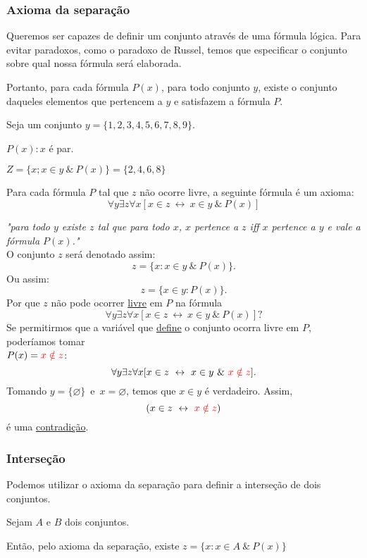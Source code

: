 \subsubsection{Axioma da separação}
Queremos ser capazes de definir um conjunto através de uma fórmula lógica. Para evitar paradoxos, como o paradoxo de Russel, temos que especificar o conjunto sobre qual nossa fórmula será elaborada.
\begin{stat}
    Portanto, para cada fórmula $P(x)$, para todo conjunto $y$, existe o conjunto daqueles elementos que pertencem a $y$ e satisfazem a fórmula $P$.
\end{stat}
\begin{exmp}
    Seja um conjunto $y = \{1,2,3,4,5,6,7,8,9\}$.

    $P(x): x$ é par.

    $Z = \{x; x \in y\ \&\ P(x)\} = \{2,4,6,8\}$
\end{exmp}
\begin{definition}
    Para cada fórmula $P$ tal que $z$ não ocorre livre, a seguinte fórmula é um axioma:
    $$\forall y \exists z \forall x [x \in z\ \leftrightarrow\ x \in y\ \&\ P(x)]$$    
\end{definition}
\textit{"para todo $y$ existe $z$ tal que para todo $x$, $x$ pertence a $z$ iff $x$ pertence a $y$ e vale a fórmula $P(x)$."}\\
O conjunto $z$ será denotado assim:
$$z = \{x: x \in y\ \&\ P(x)\}.$$
Ou assim:
$$z = \{x \in y: P(x)\}.$$
Por que $z$ não pode ocorrer \underline{livre} em $P$ na fórmula
$$\forall y \exists z \forall x [x \in z\ \leftrightarrow\ x \in y\ \&\ P(x)] ?$$
Se permitirmos que a variável que \underline{define} o conjunto ocorra livre em $P$, poderíamos tomar \\ $P(x) = \color{red}{x \notin z}$:
$$\forall y \exists z \forall x [x \in z\ \leftrightarrow\ x \in y\ \&\ \highl{x \notin z}\color{black}].$$
Tomando $y = \{\varnothing\}$\ e\ $x = \varnothing$, temos que $x \in y$ é verdadeiro. Assim,
$$(x \in z\ \leftrightarrow\ \highl{x \notin z} \color{black})$$
é uma \underline{contradição}. 

\subsubsection*{Interseção}
Podemos utilizar o axioma da separação para definir a interseção de dois conjuntos.

Sejam $A$ e $B$ dois conjuntos.

Então, pelo axioma da separação, existe $z = \{x: x \in A\ \&\ P(x)\}$

